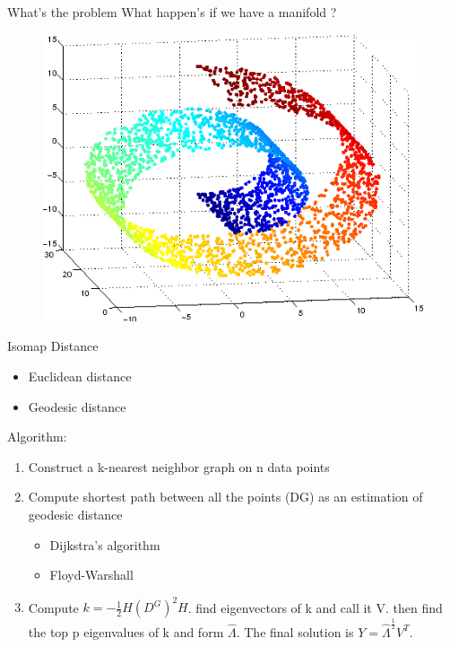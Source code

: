 \documentclass[10pt]{beamer}
\begin{document}
\begin{frame}{What's the problem}
	What happen's if we have a manifold ?
    \begin{figure}[h]
    \includegraphics[scale=.4]{manifold.png}
    \end{figure}
    
\end{frame}
\begin{frame}{Isomap}
	Distance
	\begin{itemize}
		\item Euclidean distance
		\item Geodesic distance
	\end{itemize}
	Algorithm:
	\begin{enumerate}
	\item Construct a k-nearest neighbor graph on n data points
    \item Compute shortest path between all the points (DG) as an estimation of
geodesic distance
	\begin{itemize}
	\item  Dijkstra’s algorithm
    \item  Floyd-Warshall
	\end{itemize}
    \item Compute $k = -\frac{1}{2} H(D^G)^2 H$. find eigenvectors of k and call it V. then find the top p eigenvalues of k and form $\hat{\Lambda}$. The final solution is $Y = {\hat{\Lambda}}^\frac{1}{2} V^T$.
	\end{enumerate}
    
\end{frame}
\end{document}
